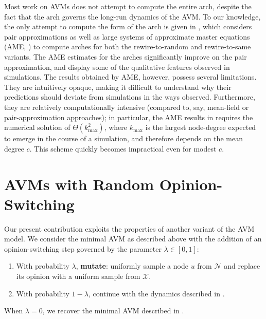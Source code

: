 \documentclass[review, onefignum, onetabnum]{siamart171218}
\begin{document}
	Most work on AVMs does not attempt to compute the entire arch, despite the fact that the arch governs the long-run dynamics of the AVM. 
	To our knowledge, the only attempt to compute the form of the arch is given in \cite{Durrett2012}, which considers pair approximations as well as large systems of approximate master equations (AME, \cite{Gleeson2013}) to compute arches for both the rewire-to-random and rewire-to-same variants.
	The AME estimates for the arches significantly improve on the pair approximation, and display some of the qualitative features observed in simulations. 
	The results obtained by AME, however, possess several limitations. 
	They are intuitively opaque, making it difficult to understand why their predictions should deviate from simulations in the ways observed.  
	Furthermore, they are relatively computationally intensive (compared to, say, mean-field or pair-approximation approaches); in particular, the AME results in \cite{Durrett2012} requires the numerical solution of $\Theta(k_\mathrm{max}^2)$, where $k_\mathrm{max}$ is the largest node-degree expected to emerge in the course of a simulation, and therefore depends on the mean degree $c$. 
	This scheme quickly becomes impractical even for modest $c$. 

\section{AVMs with Random Opinion-Switching} \label{sec:AVM_noisy}
	Our present contribution exploits the properties of another variant of the AVM model. 
	We consider the minimal AVM as described above with the addition of an opinion-switching step governed by the parameter $\lambda \in [0,1]$:  
	\begin{enumerate}
		\item With probability $\lambda$, \textbf{mutate}: uniformly sample a node $u$ from $\mathcal{N}$ and replace its opinion with a uniform sample from $\mathcal{X}$. 
		\item With probability $1-\lambda$, continue with the dynamics described in . 
	\end{enumerate}
	When $\lambda = 0$, we recover the minimal AVM described in . 
	
\end{document}
